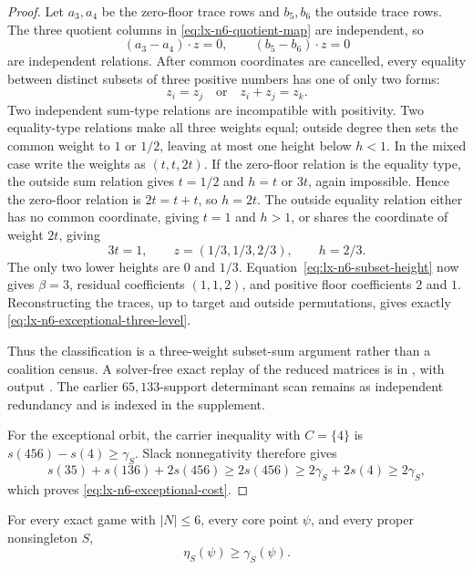\begin{proof}
Let $a_3,a_4$ be the zero-floor trace rows and $b_5,b_6$ the outside trace
rows.  The three quotient columns in \eqref{eq:lx-n6-quotient-map} are independent, so
\[
 (a_3-a_4)\mathbin{\cdot}z=0,
 \qquad (b_5-b_6)\mathbin{\cdot}z=0              \tag{E}
\]
are independent relations.  After common coordinates are cancelled, every
equality between distinct subsets of three positive numbers has one of only
two forms:
\[
 z_i=z_j \quad\text{or}\quad z_i+z_j=z_k.        \tag{ES}
\]
Two independent sum-type relations are incompatible with positivity.  Two
equality-type relations make all three weights equal; outside degree then
sets the common weight to $1$ or $1/2$, leaving at most one height below
$h<1$.  In the mixed case write the weights as $(t,t,2t)$.  If the zero-floor
relation is the equality type, the outside sum relation gives $t=1/2$ and
$h=t$ or $3t$, again impossible.  Hence the zero-floor relation is
$2t=t+t$, so $h=2t$.  The outside equality relation either has no common
coordinate, giving $t=1$ and $h>1$, or shares the coordinate of weight $2t$,
giving
\[
 3t=1,\qquad z=(1/3,1/3,2/3),\qquad h=2/3.     \tag{U}
\]
The only two lower heights are $0$ and $1/3$.  Equation~\eqref{eq:lx-n6-subset-height} now gives
$\beta=3$, residual coefficients $(1,1,2)$, and positive floor coefficients
$2$ and $1$.  Reconstructing the traces, up to target and outside
permutations, gives exactly
\eqref{eq:lx-n6-exceptional-three-level}.

Thus the classification is a three-weight subset-sum argument rather than a
coalition census.  A solver-free exact replay of the reduced matrices is in
, with output
.  The earlier
$65{,}133$-support determinant scan remains as independent redundancy and is
indexed in the supplement.

For the exceptional orbit, the carrier inequality with $C=\{4\}$ is
$s(456)-s(4)\geq\gamma_S$.  Slack nonnegativity therefore gives
\[
 s(35)+s(136)+2s(456)
 \geq2s(456)
 \geq2\gamma_S+2s(4)
 \geq2\gamma_S,
\]
which proves \eqref{eq:lx-n6-exceptional-cost}.
\end{proof}

\begin{proposition}
\label{prop:lx-quantitative-through-six}
For every exact game with $|N|\leq6$, every core point $\psi$, and every
proper nonsingleton $S$,
\[
 \eta_S(\psi)\geq\gamma_S(\psi).
\]
\end{proposition}

